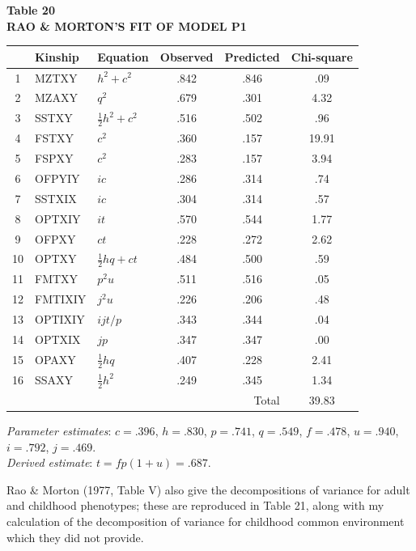 ﻿\documentclass[12pt]{article}
\begin{document}
\begin{center}
\textbf{Table 20}\\
\textbf{RAO \& MORTON'S FIT OF MODEL P1}
\end{center}
\begin{center}
\small
\begin{tabular}{c l l c c c}
\hline
 & Kinship & Equation & Observed & Predicted & Chi-square \\
\hline
1 & MZTXY & $h^2+c^2$ & .842 & .846 & .09 \\
2 & MZAXY & $q^2$ & .679 & .301 & 4.32 \\
3 & SSTXY & $\tfrac12h^2+c^2$ & .516 & .502 & .96 \\
4 & FSTXY & $c^2$ & .360 & .157 & 19.91 \\
5 & FSPXY & $c^2$ & .283 & .157 & 3.94 \\
6 & OFPYIY & $ic$ & .286 & .314 & .74 \\
7 & SSTXIX & $ic$ & .304 & .314 & .57 \\
8 & OPTXIY & $it$ & .570 & .544 & 1.77 \\
9 & OFPXY & $ct$ & .228 & .272 & 2.62 \\
10 & OPTXY & $\tfrac12hq+ct$ & .484 & .500 & .59 \\
11 & FMTXY & $p^2u$ & .511 & .516 & .05 \\
12 & FMTIXIY & $j^2u$ & .226 & .206 & .48 \\
13 & OPTIXIY & $ijt/p$ & .343 & .344 & .04 \\
14 & OPTXIX & $jp$ & .347 & .347 & .00 \\
15 & OPAXY & $\tfrac12hq$ & .407 & .228 & 2.41 \\
16 & SSAXY & $\tfrac12h^2$ & .249 & .345 & 1.34 \\
\hline
\multicolumn{5}{r}{Total} & 39.83 \\
\hline
\end{tabular}
\end{center}
\emph{Parameter estimates}: $c=.396$, $h=.830$, $p=.741$, $q=.549$, $f=.478$, $u=.940$, $i=.792$, $j=.469$.\\
\emph{Derived estimate}: $t=fp(1+u)=.687$.

Rao \& Morton (1977, Table V) also give the decompositions of variance for adult and childhood phenotypes; these are reproduced in Table 21, along with my calculation of the decomposition of variance for childhood common environment which they did not provide.
\end{document}
